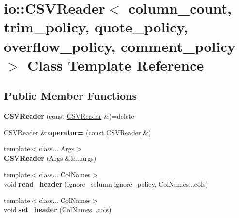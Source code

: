 \hypertarget{classio_1_1_c_s_v_reader}{}\section{io\+:\+:C\+S\+V\+Reader$<$ column\+\_\+count, trim\+\_\+policy, quote\+\_\+policy, overflow\+\_\+policy, comment\+\_\+policy $>$ Class Template Reference}
\label{classio_1_1_c_s_v_reader}
\subsection*{Public Member Functions}
\begin{DoxyCompactItemize}
\item 
{\bfseries C\+S\+V\+Reader} (const \hyperlink{classio_1_1_c_s_v_reader}{C\+S\+V\+Reader} \&)=delete\hypertarget{classio_1_1_c_s_v_reader_a0507ac5abe201969a15df76795e13c28}{}\label{classio_1_1_c_s_v_reader_a0507ac5abe201969a15df76795e13c28}

\item 
\hyperlink{classio_1_1_c_s_v_reader}{C\+S\+V\+Reader} \& {\bfseries operator=} (const \hyperlink{classio_1_1_c_s_v_reader}{C\+S\+V\+Reader} \&)\hypertarget{classio_1_1_c_s_v_reader_a37046e6629cf4254037c14440f14141d}{}\label{classio_1_1_c_s_v_reader_a37046e6629cf4254037c14440f14141d}

\item 
{\footnotesize template$<$class... Args$>$ }\\{\bfseries C\+S\+V\+Reader} (Args \&\&...args)\hypertarget{classio_1_1_c_s_v_reader_a189debf95672e7cd7582e9f73d7203e5}{}\label{classio_1_1_c_s_v_reader_a189debf95672e7cd7582e9f73d7203e5}

\item 
{\footnotesize template$<$class... Col\+Names$>$ }\\void {\bfseries read\+\_\+header} (ignore\+\_\+column ignore\+\_\+policy, Col\+Names...\+cols)\hypertarget{classio_1_1_c_s_v_reader_a9fad9ae02aa243dba6bc78156c5ce7e5}{}\label{classio_1_1_c_s_v_reader_a9fad9ae02aa243dba6bc78156c5ce7e5}

\item 
{\footnotesize template$<$class... Col\+Names$>$ }\\void {\bfseries set\+\_\+header} (Col\+Names...\+cols)\hypertarget{classio_1_1_c_s_v_reader_ab68eedff1bd59a49fa4ddb160dff94e0}{}\label{classio_1_1_c_s_v_reader_ab68eedff1bd59a49fa4ddb160dff94e0}


\end{DoxyCompactItemize}
